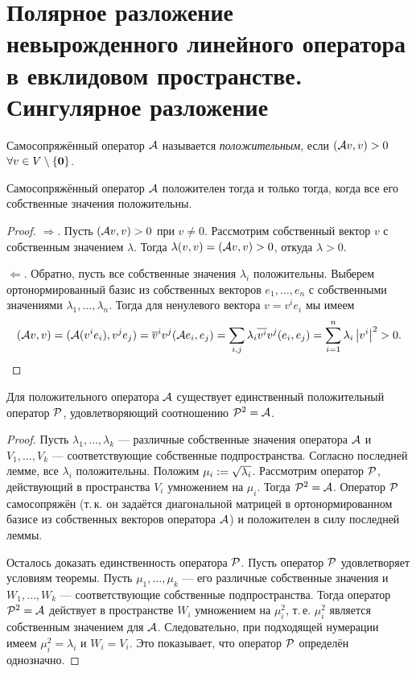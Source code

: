\section{Полярное разложение невырожденного линейного оператора в евклидовом пространстве. Сингулярное разложение}

\begin{definition}
    Самосопряжённый оператор $\A$ называется \textit{положительным}, если $(\A v, v) > 0$ $\forall v \in V \setminus \{\bs{0}\}$.
\end{definition}

\begin{lemma}
    Самосопряжённый оператор $\A$ положителен тогда и только тогда, когда все его собственные значения положительны. 
\end{lemma}

\begin{proof}
    $\Rightarrow$. Пусть $(\A v, v) > 0$ при $v \ne 0$. Рассмотрим собственный вектор $v$ с собственным значением $\lambda$. Тогда $\lambda(v, v) = (\A v, v) > 0$, откуда $\lambda > 0$.

    $\Leftarrow$. Обратно, пусть все собственные значения $\lambda_i$ положительны. Выберем ортонормированный базис из собственных векторов $e_1, \ldots, e_n$ с собственными значениями $\lambda_1, \ldots, \lambda_n$. Тогда для ненулевого вектора $v = v^ie_i$ мы имеем
    \[
        (\A v, v) = (\A(v^ie_i), v^je_j) = \overline{v}^iv^j(\A e_i, e_j) = \sum_{i, j}\lambda_i\overline{v^i}v^j(e_i, e_j) = \sum_{i = 1}^n\lambda_i\abs{v^i}^2 > 0.
    \]
\end{proof}

\begin{theorem}
    Для положительного оператора $\A$ существует единственный положительный оператор $\P$, удовлетворяющий соотношению $\P^2 = \A$.
\end{theorem}

\begin{proof}
    Пусть $\lambda_1, \ldots, \lambda_k$ --- различные собственные значения оператора $\A$ и $V_1, \ldots, V_k$ --- соответствующие собственные подпространства. Согласно последней лемме, все $\lambda_i$ положительны. Положим $\mu_i \vcentcolon = \sqrt{\lambda_i}$. Рассмотрим оператор $\P$, действующий в пространства $V_i$ умножением на $\mu_i$. Тогда $\P^2 = \A$. Оператор $\P$ самосопряжён (т.\,к. он задаётся диагональной матрицей в ортонормированном базисе из собственных векторов оператора $\A$) и положителен в силу последней леммы.

    Осталось доказать единственность оператора $\P$. Пусть оператор $\P$ удовлетворяет условиям теоремы. Пусть $\mu_1, \ldots, \mu_k$ --- его различные собственные значения и $W_1, \ldots, W_k$ --- соответствующие собственные подпространства. Тогда оператор $\P^2 = \A$ действует в пространстве $W_i$ умножением на $\mu_i^2$, т.\,е. $\mu_i^2$ является собственным значением для $\A$. Следовательно, при подходящей нумерации имеем $\mu_i^2 = \lambda_i$ и $W_i = V_i$. Это показывает, что оператор $\P$ определён однозначно.
\end{proof}

